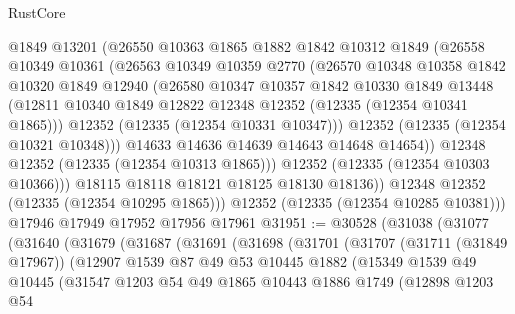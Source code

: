 \begin{lexlean}{RustCore}
\begin{coremodule}
              @1849
              @13201
              (@26550
                @10363
                @1865
                @1882
                @1842
                @10312
                @1849
                (@26558
                  @10349
                  @10361
                  (@26563
                    @10349
                    @10359
                    @2770
                    (@26570
                      @10348
                      @10358
                      @1842
                      @10320
                      @1849
                      @12940
                      (@26580
                        @10347
                        @10357
                        @1842
                        @10330
                        @1849
                        @13448
                        (@12811 @10340 @1849 @12822 @12348 @12352 (@12335 (@12354 @10341 @1865)))
                        @12352
                        (@12335 (@12354 @10331 @10347)))
                      @12352
                      (@12335 (@12354 @10321 @10348)))
                    @14633
                    @14636
                    @14639
                    @14643
                    @14648
                    @14654))
                @12348
                @12352
                (@12335 (@12354 @10313 @1865)))
              @12352
              (@12335 (@12354 @10303 @10366)))
            @18115
            @18118
            @18121
            @18125
            @18130
            @18136))
        @12348
        @12352
        (@12335 (@12354 @10295 @1865)))
      @12352
      (@12335 (@12354 @10285 @10381)))
    @17946
    @17949
    @17952
    @17956
    @17961
@31951 := @30528
    (@31038
      (@31077
        (@31640
          (@31679
            (@31687
              (@31691
                (@31698
                  (@31701
                    (@31707
                      (@31711 (@31849 @17967))
                      (@12907
                        @1539
                        @87
                        @49
                        @53
                        @10445
                        @1882
                        (@15349
                          @1539
                          @49
                          @10445
                          (@31547
                            @1203
                            @54
                            @49
                            @1865
                            @10443
                            @1886
                            @1749
                            (@12898
                              @1203
                              @54

\end{coremodule}
\end{lexlean}
